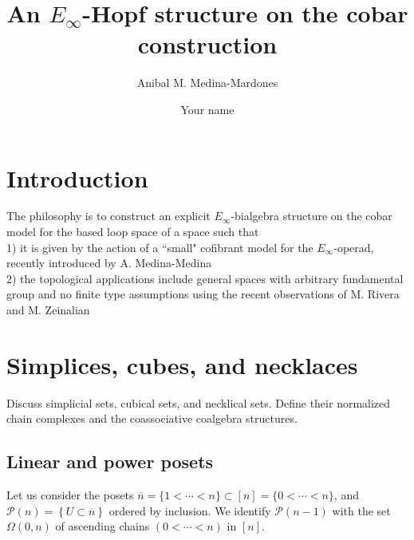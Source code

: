 \documentclass{amsart}
\renewcommand{\P}{\mathcal{P}}
\begin{document}
\title{An $E_\infty$-Hopf structure on the cobar construction}
\author{Anibal M. Medina-Mardones}
\address{Max Plank Institute for Mathematics, Bonn, Germany}
\address{Department of Mathematics, University of Notre Dame, Notre Dame, IN, USA}
\author{Your name}
\address{Your address}


\begin{abstract}
	
\end{abstract} 

\vspace*{-1cm}

\maketitle

\section{Introduction}
The philosophy is to construct an explicit $E_{\infty}$-bialgebra structure on the cobar model for the based loop space of a space such that
\\
1) it is given by the action of a ``small" cofibrant model for the $E_{\infty}$-operad, recently introduced by A. Medina-Medina
\\
2) the topological applications include general spaces with arbitrary fundamental group and no finite type assumptions using the recent observations of M. Rivera and M. Zeinalian 

\section{Simplices, cubes, and necklaces}

Discuss simplicial sets, cubical sets, and necklical sets. Define their normalized chain complexes and the coassociative coalgebra structures.

\subsection{Linear and power posets}

Let us consider the posets $\overline{n} = \{1 < \cdots < n\} \subset [n] = \{0 < \cdots < n\}$, and $\P(n) = \left\{U \subset \overline{n}\right\}$ ordered by inclusion. We identify $\P(n-1)$ with the set $\Omega(0, n)$ of ascending chains $(0 < \cdots < n)$ in $[n]$.
\end{document}

